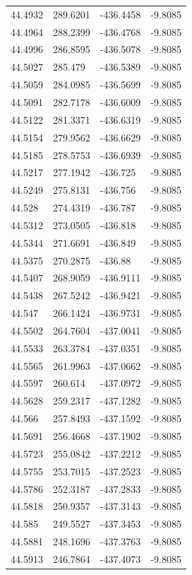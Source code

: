 \begin{table}[H]
\begin{tabular}{llll}
44.4932 & 289.6201 & -436.4458 & -9.8085 \\
44.4964 & 288.2399 & -436.4768 & -9.8085 \\
44.4996 & 286.8595 & -436.5078 & -9.8085 \\
44.5027 & 285.479 & -436.5389 & -9.8085 \\
44.5059 & 284.0985 & -436.5699 & -9.8085 \\
44.5091 & 282.7178 & -436.6009 & -9.8085 \\
44.5122 & 281.3371 & -436.6319 & -9.8085 \\
44.5154 & 279.9562 & -436.6629 & -9.8085 \\
44.5185 & 278.5753 & -436.6939 & -9.8085 \\
44.5217 & 277.1942 & -436.725 & -9.8085 \\
44.5249 & 275.8131 & -436.756 & -9.8085 \\
44.528 & 274.4319 & -436.787 & -9.8085 \\
44.5312 & 273.0505 & -436.818 & -9.8085 \\
44.5344 & 271.6691 & -436.849 & -9.8085 \\
44.5375 & 270.2875 & -436.88 & -9.8085 \\
44.5407 & 268.9059 & -436.9111 & -9.8085 \\
44.5438 & 267.5242 & -436.9421 & -9.8085 \\
44.547 & 266.1424 & -436.9731 & -9.8085 \\
44.5502 & 264.7604 & -437.0041 & -9.8085 \\
44.5533 & 263.3784 & -437.0351 & -9.8085 \\
44.5565 & 261.9963 & -437.0662 & -9.8085 \\
44.5597 & 260.614 & -437.0972 & -9.8085 \\
44.5628 & 259.2317 & -437.1282 & -9.8085 \\
44.566 & 257.8493 & -437.1592 & -9.8085 \\
44.5691 & 256.4668 & -437.1902 & -9.8085 \\
44.5723 & 255.0842 & -437.2212 & -9.8085 \\
44.5755 & 253.7015 & -437.2523 & -9.8085 \\
44.5786 & 252.3187 & -437.2833 & -9.8085 \\
44.5818 & 250.9357 & -437.3143 & -9.8085 \\
44.585 & 249.5527 & -437.3453 & -9.8085 \\
44.5881 & 248.1696 & -437.3763 & -9.8085 \\
44.5913 & 246.7864 & -437.4073 & -9.8085 \\

\end{tabular}
\end{table}

